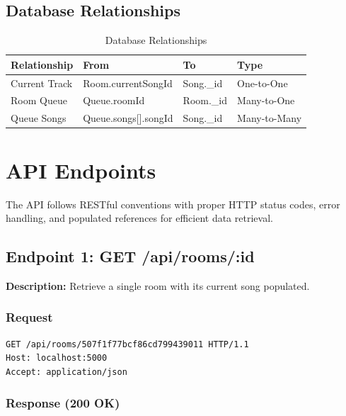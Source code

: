 \documentclass[11pt,a4paper]{article}
\begin{document}
\subsection{Database Relationships}

\begin{table}[H]
\centering
\begin{tabular}{|l|l|l|l|}
\hline
\textbf{Relationship} & \textbf{From} & \textbf{To} & \textbf{Type} \\
\hline
Current Track & Room.currentSongId & Song.\_id & One-to-One \\
\hline
Room Queue & Queue.roomId & Room.\_id & Many-to-One \\
\hline
Queue Songs & Queue.songs[].songId & Song.\_id & Many-to-Many \\
\hline
\end{tabular}
\caption{Database Relationships}
\end{table}

\section{API Endpoints}

The API follows RESTful conventions with proper HTTP status codes, error handling, and populated references for efficient data retrieval.

\subsection{Endpoint 1: GET /api/rooms/:id}

\textbf{Description:} Retrieve a single room with its current song populated.

\subsubsection{Request}

\begin{lstlisting}[language=bash]
GET /api/rooms/507f1f77bcf86cd799439011 HTTP/1.1
Host: localhost:5000
Accept: application/json
\end{lstlisting}

\subsubsection{Response (200 OK)}
\end{document}

